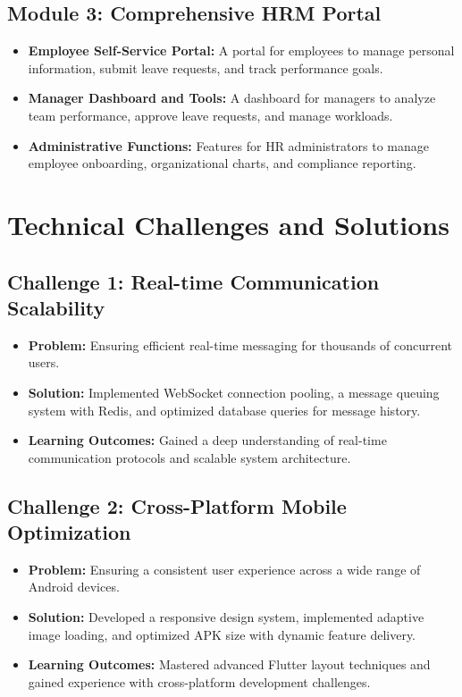\subsection{Module 3: Comprehensive HRM Portal}
\begin{itemize}
    \item \textbf{Employee Self-Service Portal:} A portal for employees to manage personal information, submit leave requests, and track performance goals.
    \item \textbf{Manager Dashboard and Tools:} A dashboard for managers to analyze team performance, approve leave requests, and manage workloads.
    \item \textbf{Administrative Functions:} Features for HR administrators to manage employee onboarding, organizational charts, and compliance reporting.
\end{itemize}

\section{Technical Challenges and Solutions}
\subsection{Challenge 1: Real-time Communication Scalability}
\begin{itemize}
    \item \textbf{Problem:} Ensuring efficient real-time messaging for thousands of concurrent users.
    \item \textbf{Solution:} Implemented WebSocket connection pooling, a message queuing system with Redis, and optimized database queries for message history.
    \item \textbf{Learning Outcomes:} Gained a deep understanding of real-time communication protocols and scalable system architecture.
\end{itemize}

\subsection{Challenge 2: Cross-Platform Mobile Optimization}
\begin{itemize}
    \item \textbf{Problem:} Ensuring a consistent user experience across a wide range of Android devices.
    \item \textbf{Solution:} Developed a responsive design system, implemented adaptive image loading, and optimized APK size with dynamic feature delivery.
    \item \textbf{Learning Outcomes:} Mastered advanced Flutter layout techniques and gained experience with cross-platform development challenges.
\end{itemize}

